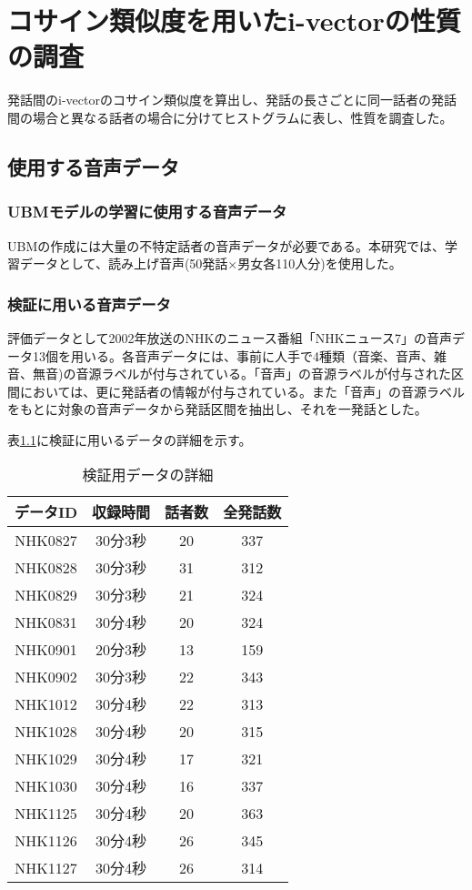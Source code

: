 \chapter{コサイン類似度を用いたi-vectorの性質の調査}
発話間のi-vectorのコサイン類似度を算出し、発話の長さごとに同一話者の発話間の場合と異なる話者の場合に分けてヒストグラムに表し、性質を調査した。
\section{使用する音声データ}
\subsection{UBMモデルの学習に使用する音声データ}
UBMの作成には大量の不特定話者の音声データが必要である。本研究では、学習データとして、読み上げ音声\cite{ATR}(50発話×男女各110人分)を使用した。
\subsection{検証に用いる音声データ}
評価データとして2002年放送のNHKのニュース番組「NHKニュース7」の音声データ13個を用いる。各音声データには、事前に人手で4種類（音楽、音声、雑音、無音)の音源ラベルが付与されている。「音声」の音源ラベルが付与された区間においては、更に発話者の情報が付与されている。また「音声」の音源ラベルをもとに対象の音声データから発話区間を抽出し、それを一発話とした。\par
表\ref{val_detail}に検証に用いるデータの詳細を示す。

\begin{table}[htb]
  \begin{center}
  \label{val_detail}
    \caption{検証用データの詳細}
    \begin{tabular}{|c||c|c|c|} \hline
      データID & 収録時間 & 話者数 & 全発話数 \\ \hline
      NHK0827 & 30分3秒 & 20 & 337 \\ \hline
      NHK0828 & 30分3秒 & 31 & 312\\ \hline
      NHK0829 & 30分3秒 & 21 & 324 \\ \hline
      NHK0831 & 30分4秒 & 20 & 324\\ \hline
      NHK0901 & 20分3秒 & 13 & 159\\ \hline
      NHK0902 & 30分3秒 & 22 & 343\\ \hline
      NHK1012 & 30分4秒 & 22 & 313\\ \hline
      NHK1028 & 30分4秒 & 20 & 315\\ \hline
      NHK1029 & 30分4秒 & 17 & 321\\ \hline
      NHK1030 & 30分4秒 & 16 & 337\\ \hline
      NHK1125 & 30分4秒 & 20 & 363\\ \hline
      NHK1126 & 30分4秒 & 26 & 345\\ \hline
      NHK1127 & 30分4秒 & 26 & 314\\ \hline
    \end{tabular}
  \end{center}
\end{table}


